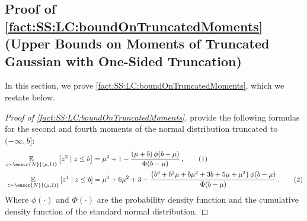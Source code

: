 \documentclass[11pt,letterpaper]{article}
\theoremstyle{plain}
\theoremstyle{definition}
\theoremstyle{remark}
\newcommand{\yesnum}{\addtocounter{equation}{1}\tag{\theequation}}
\newcommand{\inparen}[1]{\ensuremath{\left(#1\right)}}
\newcommand{\insquare}[1]{\ensuremath{\left[#1\right]}}
\newcommand{\E}{\operatornamewithlimits{\mathbb{E}}}
\newcommand{\Ex}{\E}
\newcommand{\customcal}[1]{\euscr{#1}}
\newcommand{\cN}{\customcal{N}}
\newcommand{\normal}[2]{\cN{\inparen{#1,#2}}}
\begin{document}
{{{    \subsection{Proof of \cref{fact:SS:LC:boundOnTruncatedMoments} (Upper Bounds on Moments of Truncated Gaussian with One-Sided Truncation)}
        \label{sec:proofof:fact:SS:LC:boundOnTruncatedMoments}
        In this section, we prove \cref{fact:SS:LC:boundOnTruncatedMoments}, which we restate below.
        \factboundOnTruncatedMoments*
        \begin{proof}[Proof of \cref{fact:SS:LC:boundOnTruncatedMoments}]
            \citet{orjebin2014recursive} provide the following formulas for the second and fourth moments of the normal distribution truncated to $(-\infty,b]$:
            \begin{align*}
                \Ex_{z\sim \normal{\mu}{1}}\insquare{z^2\mid z\leq b}
                    &= \mu^2 + 1 - \frac{(\mu+b)\,\phi(b-\mu)}{\Phi(b-\mu)}\,,
                    \yesnum\label{eq:SS:LC:momentBound2}\\
                \Ex_{z\sim \normal{\mu}{1}}\insquare{z^{\smash{4}}\mid z\leq b}
                    &=\mu^4 + 6\mu^2 + 3 - \frac{\bigl(b^3+b^2\mu+b\mu^2+3b+5\mu+\mu^3\bigr)\,\phi(b-\mu)}{\Phi(b-\mu)}\,.
                    \yesnum\label{eq:SS:LC:momentBound4}
            \end{align*} 
            Where $\phi(\cdot)$ and $\Phi(\cdot)$ are the probability density function and the cumulative density function of the standard normal distribution.
            

\end{proof}}}}
\end{document}

